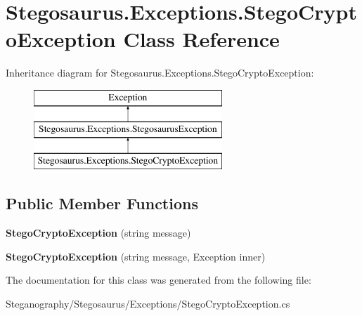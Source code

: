 \hypertarget{class_stegosaurus_1_1_exceptions_1_1_stego_crypto_exception}{}\section{Stegosaurus.\+Exceptions.\+Stego\+Crypto\+Exception Class Reference}
\label{class_stegosaurus_1_1_exceptions_1_1_stego_crypto_exception}
Inheritance diagram for Stegosaurus.\+Exceptions.\+Stego\+Crypto\+Exception\+:\begin{figure}[H]
\begin{center}
\leavevmode
\includegraphics[height=3.000000cm]{class_stegosaurus_1_1_exceptions_1_1_stego_crypto_exception}
\end{center}
\end{figure}
\subsection*{Public Member Functions}
\begin{DoxyCompactItemize}
\item 
{\bfseries Stego\+Crypto\+Exception} (string message)\hypertarget{class_stegosaurus_1_1_exceptions_1_1_stego_crypto_exception_a87c4de3568884c827b238f8afaa50646}{}\label{class_stegosaurus_1_1_exceptions_1_1_stego_crypto_exception_a87c4de3568884c827b238f8afaa50646}

\item 
{\bfseries Stego\+Crypto\+Exception} (string message, Exception inner)\hypertarget{class_stegosaurus_1_1_exceptions_1_1_stego_crypto_exception_ad2e4e6e887d4c64801eb9465f7c4129a}{}\label{class_stegosaurus_1_1_exceptions_1_1_stego_crypto_exception_ad2e4e6e887d4c64801eb9465f7c4129a}

\end{DoxyCompactItemize}


The documentation for this class was generated from the following file\+:\begin{DoxyCompactItemize}
\item 
Steganography/\+Stegosaurus/\+Exceptions/Stego\+Crypto\+Exception.\+cs\end{DoxyCompactItemize}

